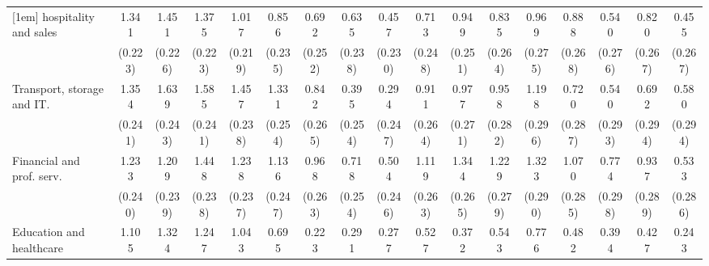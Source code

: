 {\begin{tabular}{l*{16}{c}}
[1em]
hospitality and sales&       1.341\sym{***}&       1.451\sym{***}&       1.375\sym{***}&       1.017\sym{***}&       0.856\sym{***}&       0.692\sym{**} &       0.635\sym{**} &       0.457\sym{*}  &       0.713\sym{**} &       0.949\sym{***}&       0.835\sym{**} &       0.969\sym{***}&       0.888\sym{***}&       0.540         &       0.820\sym{**} &       0.455         \\
                    &     (0.223)         &     (0.226)         &     (0.223)         &     (0.219)         &     (0.235)         &     (0.252)         &     (0.238)         &     (0.230)         &     (0.248)         &     (0.251)         &     (0.264)         &     (0.275)         &     (0.268)         &     (0.276)         &     (0.267)         &     (0.267)         \\
[1em]
Transport, storage and IT.&       1.354\sym{***}&       1.639\sym{***}&       1.585\sym{***}&       1.457\sym{***}&       1.331\sym{***}&       0.842\sym{**} &       0.395         &       0.294         &       0.911\sym{***}&       0.977\sym{***}&       0.958\sym{***}&       1.198\sym{***}&       0.720\sym{*}  &       0.540         &       0.692\sym{*}  &       0.580\sym{*}  \\
                    &     (0.241)         &     (0.243)         &     (0.241)         &     (0.238)         &     (0.254)         &     (0.265)         &     (0.254)         &     (0.247)         &     (0.264)         &     (0.271)         &     (0.282)         &     (0.296)         &     (0.287)         &     (0.293)         &     (0.294)         &     (0.294)         \\
[1em]
Financial and prof. serv.&       1.233\sym{***}&       1.209\sym{***}&       1.448\sym{***}&       1.238\sym{***}&       1.136\sym{***}&       0.968\sym{***}&       0.718\sym{**} &       0.504\sym{*}  &       1.119\sym{***}&       1.344\sym{***}&       1.229\sym{***}&       1.323\sym{***}&       1.070\sym{***}&       0.774\sym{**} &       0.937\sym{**} &       0.533         \\
                    &     (0.240)         &     (0.239)         &     (0.238)         &     (0.237)         &     (0.247)         &     (0.263)         &     (0.254)         &     (0.246)         &     (0.263)         &     (0.265)         &     (0.279)         &     (0.290)         &     (0.285)         &     (0.298)         &     (0.289)         &     (0.286)         \\
[1em]
Education and healthcare&       1.105\sym{***}&       1.324\sym{***}&       1.247\sym{***}&       1.043\sym{***}&       0.695\sym{*}  &       0.223         &       0.291         &       0.277         &       0.527         &       0.372         &       0.543         &       0.776\sym{*}  &       0.482         &       0.394         &       0.427         &       0.243         \\

\end{tabular}}

